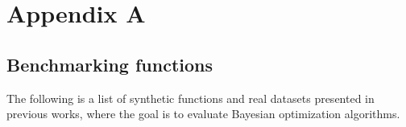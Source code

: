\ifpdf
    \graphicspath{{Appendix1/Figs/Raster/}{Appendix1/Figs/PDF/}{Appendix1/Figs/}}
\else
    \graphicspath{{Appendix1/Figs/Vector/}{Appendix1/Figs/}}
\fi

\chapter{Appendix A}

\section{Benchmarking functions}

The following is a list of synthetic functions and real datasets presented in previous works, where the goal is to evaluate Bayesian optimization algorithms. 


